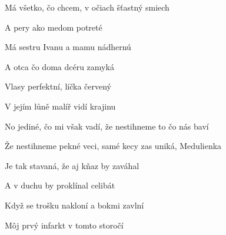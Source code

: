 \begin{song}



\begin{hchordbox}
\end{hchordbox}

\large

\bigskip

\Intro {}    \par

\bigskip

Má všetko, čo chcem, v očiach šťastný smiech \par
A pery ako medom potreté  \par
{}Má sestru Ivanu a mamu nádhernú \par
A otca čo doma dcéru zamyká  \par
{}Vlasy perfektní, líčka červený \par
V jejím lůně malíř vidí krajinu  \par

\bigskip

No jediné, čo mi však vadí, že nestihneme to čo nás baví \par
Že nestihneme pekné veci, samé kecy zas uniká, Medulienka \par

\bigskip

    \par

\bigskip

Je tak stavaná, že aj kňaz by zaváhal \par
A v duchu by proklínal celibát  \par
Když se trošku nakloní a bokmi zavlní \par
Môj prvý infarkt  v tomto storočí  \par


\end{song}

